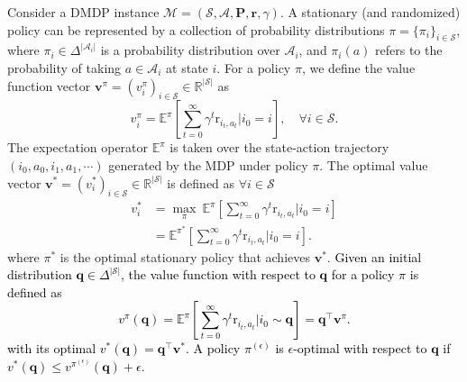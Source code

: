 \documentclass[12pt]{article}
\begin{document}

Consider a DMDP instance $\mathcal{M} = (\mathcal{S},\mathcal{A},\boldsymbol{\text{P}},\boldsymbol{\text{r}},\gamma)$. 
A stationary (and randomized) policy %
can be represented by a collection of probability distributions $\pi = \{\pi_i\}_{i \in \mathcal{S}}$, where $\pi_i \in \Delta^{|\mathcal{A}_i|}$ is a probability distribution over $\mathcal{A}_i$, and $\pi_i(a)$ refers to the probability of taking $a \in \mathcal{A}_i$ at state $i$. For a policy $\pi$, we define the value function vector $\boldsymbol{v}^{\pi} = (v_i^{\pi})_{i \in \mathcal{S}} \in \mathbb{R}^{|\mathcal{S}|}$ as
\begin{equation*}
    v_i^{\pi} =  \mathbb{E}^{\pi} \left[\sum_{t=0}^{\infty} \gamma^t \text{r}_{i_t,a_t} | i_0 = i  \right], \quad \forall i \in \mathcal{S}.
\end{equation*}
The expectation operator $\mathbb{E}^{\pi}$ is taken over the state-action trajectory  $(i_0,a_0,i_1,a_1,\cdots)$ generated by the MDP under policy $\pi$. The optimal value vector $\boldsymbol{v}^{*} = (v_i^{*})_{i \in \mathcal{S}} \in \mathbb{R}^{|\mathcal{S}|}$ is defined as $\forall i \in \mathcal{S}$
\begin{equation*}
    \begin{aligned}
     v_i^{*} & =  \max_{\pi} \ \mathbb{E}^{\pi} \left[\sum_{t=0}^{\infty} \gamma^t \text{r}_{i_t,a_t} | i_0 = i  \right] \\
     & = \mathbb{E}^{\pi^*} \left[\sum_{t=0}^{\infty} \gamma^t \text{r}_{i_t,a_t} | i_0 = i  \right].
     \end{aligned}
\end{equation*}
where $\pi^*$ is the optimal stationary policy that achieves $\boldsymbol{v}^{*}$. \textcolor{black}{Given an initial distribution $\boldsymbol{q} \in \Delta^{|\mathcal{S}|}$, the value function with respect to $\boldsymbol{q}$ for a policy $\pi$ is defined as
\begin{equation*}
    v^{\pi}(\boldsymbol{q}) = \mathbb{E}^{\pi} \left[\sum_{t=0}^{\infty} \gamma^t \text{r}_{i_t,a_t} | i_0 \sim \boldsymbol{q} \right] = \boldsymbol{q}^{\top} \boldsymbol{v}^{\pi}.
\end{equation*}
with its optimal $v^{*}(\boldsymbol{q}) = \boldsymbol{q}^{\top} \boldsymbol{v}^*$. A policy $\pi^{(\epsilon)}$ is $\epsilon$-optimal with respect to $\boldsymbol{q}$ if $v^{*}(\boldsymbol{q}) \le v^{\pi^{(\epsilon)}}(\boldsymbol{q}) + \epsilon$.}
\end{document}
